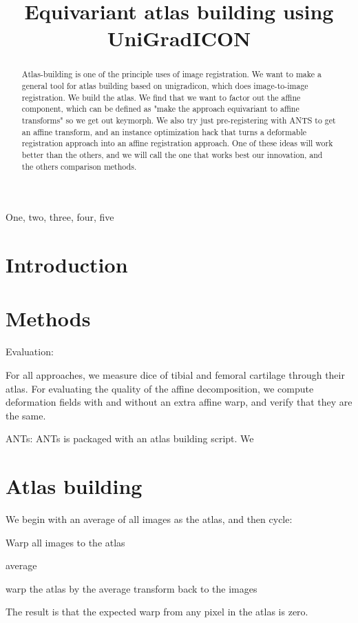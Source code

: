 \documentclass{article}
\title{Equivariant atlas building using UniGradICON}
\begin{document}
\maketitle
\begin{abstract}
	Atlas-building is one of the principle uses of image registration. We want to make a general tool for atlas building based on unigradicon, which does image-to-image registration. We build the atlas. We find that we want to factor out the affine component, which can be defined as "make the approach equivariant to affine transforms" so we get out keymorph. We also try just pre-registering with ANTS to get an affine transform, and an instance optimization hack that turns a deformable registration approach into an affine registration approach. One of these ideas will work better than the others, and we will call the one that works best our innovation, and the others comparison methods.
\end{abstract}
\begin{keywords}
One, two, three, four, five
\end{keywords}
\section{Introduction}
\label{sec:intro}

\section{Methods}

Evaluation:

For all approaches, we measure dice of tibial and femoral cartilage through their atlas. For  evaluating the quality of the affine decomposition, we compute deformation fields with and without an extra affine warp, and verify that they are the same.

ANTs:
ANTs is packaged with an atlas building script. We 

\section{Atlas building}

We begin with an average of all images as the atlas, and then cycle:

Warp all images to the atlas

average

warp the atlas by the average transform back to the images

The result is that the expected warp from any pixel in the atlas is zero.
\end{document}
